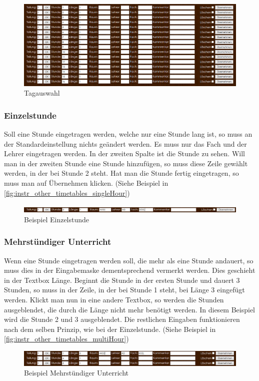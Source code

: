 \begin{figure}[H]
\centering
\includegraphics[keepaspectratio=true, width=17cm]{images/screenshots/timetables_input_layout.png}
\caption{Tagauswahl}
\label{fig:instr_other_timetables_layout}
\end{figure}
\subsubsection{Einzelstunde}
Soll eine Stunde eingetragen werden, welche nur eine Stunde lang ist, so muss an der Standardeinstellung nichts geändert werden. Es muss nur das Fach und der Lehrer eingetragen werden. In der zweiten Spalte ist die Stunde zu sehen. Will man in der zweiten Stunde eine Stunde hinzufügen, so muss diese Zeile gewählt werden, in der bei Stunde 2 steht. Hat man die Stunde fertig eingetragen, so muss man auf Übernehmen klicken. (Siehe Beispiel in \autoref{fig:instr_other_timetables_singleHour})
\begin{figure}[H]
\centering
\includegraphics[keepaspectratio=true, width=17cm]{images/screenshots/timetables_input_singleHour.png}
\caption{Beispiel Einzelstunde}
\label{fig:instr_other_timetables_singleHour}
\end{figure}
\subsubsection{Mehrstündiger Unterricht}
Wenn eine Stunde eingetragen werden soll, die mehr als eine Stunde andauert, so muss dies in der Eingabemaske dementsprechend vermerkt werden. Dies geschieht in der Textbox Länge. Beginnt die Stunde in der ersten Stunde und dauert 3 Stunden, so muss in der Zeile, in der bei Stunde 1 steht, bei Länge 3 eingefügt werden. Klickt man nun in eine andere Textbox, so werden die Stunden ausgeblendet, die durch die Länge nicht mehr benötigt werden. In diesem Beispiel wird die Stunde 2 und 3 ausgeblendet. Die restlichen Eingaben funktionieren nach dem selben Prinzip, wie bei der Einzelstunde. (Siehe Beispiel in \autoref{fig:instr_other_timetables_multiHour})
\begin{figure}[H]
\centering
\includegraphics[keepaspectratio=true, width=17cm]{images/screenshots/timetables_input_multiHour.png}
\caption{Beispiel Mehrstündiger Unterricht}
\label{fig:instr_other_timetables_multiHour}
\end{figure}
